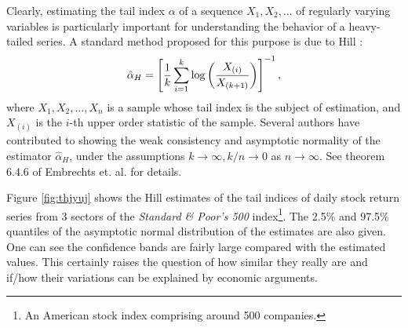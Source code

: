 Clearly, estimating the tail index $\alpha$ of a sequence
$X_1, X_2, \dots$ of regularly varying variables is particularly
important for understanding the behavior of a heavy-tailed series. A
standard method proposed for this purpose is due to Hill
\cite{hill1975simple}:
\begin{equation}
  \label{eq:fhhty}
  \hat \alpha_H = \left[
    {1 \over k} \sum_{i=1}^k \log \left(
      X_{(i)} \over X_{(k+1)}
    \right)
  \right]^{-1},
\end{equation}
where $X_1, X_2, \dots, X_n$ is a sample whose tail index is the
subject of estimation, and $X_{(i)}$ is the $i$-th upper order
statistic of the sample. Several authors have contributed to showing
the weak consistency and asymptotic normality of the estimator
$\hat \alpha_H$, under the assumptions $k \to \infty, k/n \to 0$
as $n \to \infty$. See theorem 6.4.6 of Embrechts et. al.
\cite{embrechts:klueppelberg:mikosch:1997} for details.


Figure \ref{fig:thjyuj} shows the Hill estimates of the tail indices
of daily stock return series from 3 sectors of the
{\em Standard \& Poor's 500} index\footnote{An American stock index
  comprising around 500 companies.}. The 2.5\% and 97.5\% quantiles of
the asymptotic normal distribution of the estimates are also
given. One can see the confidence bands are fairly large compared with
the estimated values. This certainly raises the question of how
similar they really are and if/how their variations can be explained by
economic arguments.


